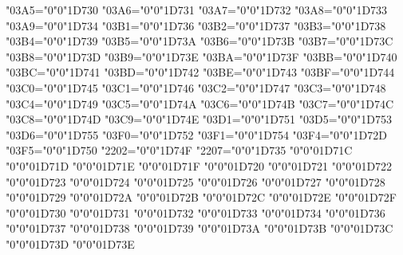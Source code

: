 {    \Umathcode"03A5="0"0"1D730%
    \Umathcode"03A6="0"0"1D731%
    \Umathcode"03A7="0"0"1D732%
    \Umathcode"03A8="0"0"1D733%
    \Umathcode"03A9="0"0"1D734%
    \Umathcode"03B1="0"0"1D736%
    \Umathcode"03B2="0"0"1D737%
    \Umathcode"03B3="0"0"1D738%
    \Umathcode"03B4="0"0"1D739%
    \Umathcode"03B5="0"0"1D73A%
    \Umathcode"03B6="0"0"1D73B%
    \Umathcode"03B7="0"0"1D73C%
    \Umathcode"03B8="0"0"1D73D%
    \Umathcode"03B9="0"0"1D73E%
    \Umathcode"03BA="0"0"1D73F%
    \Umathcode"03BB="0"0"1D740%
    \Umathcode"03BC="0"0"1D741%
    \Umathcode"03BD="0"0"1D742%
    \Umathcode"03BE="0"0"1D743%
    \Umathcode"03BF="0"0"1D744%
    \Umathcode"03C0="0"0"1D745%
    \Umathcode"03C1="0"0"1D746%
    \Umathcode"03C2="0"0"1D747%
    \Umathcode"03C3="0"0"1D748%
    \Umathcode"03C4="0"0"1D749%
    \Umathcode"03C5="0"0"1D74A%
    \Umathcode"03C6="0"0"1D74B%
    \Umathcode"03C7="0"0"1D74C%
    \Umathcode"03C8="0"0"1D74D%
    \Umathcode"03C9="0"0"1D74E%
    \Umathcode"03D1="0"0"1D751%
    \Umathcode"03D5="0"0"1D753%
    \Umathcode"03D6="0"0"1D755%
    \Umathcode"03F0="0"0"1D752%
    \Umathcode"03F1="0"0"1D754%
    \Umathcode"03F4="0"0"1D72D%
    \Umathcode"03F5="0"0"1D750%
    \Umathcode"2202="0"0"1D74F%
    \Umathcode"2207="0"0"1D735%
    \Umathchardef\Alpha     "0"0"01D71C%
    \Umathchardef\Beta      "0"0"01D71D%
    \Umathchardef\Gamma     "0"0"01D71E%
    \Umathchardef\Delta     "0"0"01D71F%
    \Umathchardef\Epsilon   "0"0"01D720%
    \Umathchardef\Zeta      "0"0"01D721%
    \Umathchardef\Eta       "0"0"01D722%
    \Umathchardef\Theta     "0"0"01D723%
    \Umathchardef\Iota      "0"0"01D724%
    \Umathchardef\Kappa     "0"0"01D725%
    \Umathchardef\Lambda    "0"0"01D726%
    \Umathchardef\Mu        "0"0"01D727%
    \Umathchardef\Nu        "0"0"01D728%
    \Umathchardef\Xi        "0"0"01D729%
    \Umathchardef\Omicron   "0"0"01D72A%
    \Umathchardef\Pi        "0"0"01D72B%
    \Umathchardef\Rho       "0"0"01D72C%
    \Umathchardef\Sigma     "0"0"01D72E%
    \Umathchardef\Tau       "0"0"01D72F%
    \Umathchardef\Upsilon   "0"0"01D730%
    \Umathchardef\Phi       "0"0"01D731%
    \Umathchardef\Chi       "0"0"01D732%
    \Umathchardef\Psi       "0"0"01D733%
    \Umathchardef\Omega     "0"0"01D734%
    \Umathchardef\alpha     "0"0"01D736%
    \Umathchardef\beta      "0"0"01D737%
    \Umathchardef\gamma     "0"0"01D738%
    \Umathchardef\delta     "0"0"01D739%
    \Umathchardef\varepsilon"0"0"01D73A%
    \Umathchardef\zeta      "0"0"01D73B%
    \Umathchardef\eta       "0"0"01D73C%
    \Umathchardef\theta     "0"0"01D73D%
    \Umathchardef\iota      "0"0"01D73E%
}
